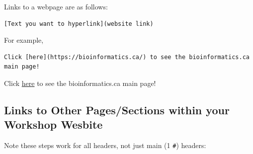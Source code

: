 \documentclass[
]{book}
\theoremstyle{definition}
\theoremstyle{definition}
\theoremstyle{definition}
\theoremstyle{definition}
\theoremstyle{remark}
\begin{document}
Links to a webpage are as follows:

\begin{verbatim}
[Text you want to hyperlink](website link)
\end{verbatim}

For example,

\begin{verbatim}
Click [here](https://bioinformatics.ca/) to see the bioinformatics.ca main page!
\end{verbatim}

Click \href{https://bioinformatics.ca/}{here} to see the bioinformatics.ca main page!

\subsection*{Links to Other Pages/Sections within your Workshop Wesbite}\label{links-to-other-pagessections-within-your-workshop-wesbite}

Note these steps work for all headers, not just main (1 \texttt{\#}) headers:
\end{document}

